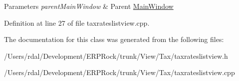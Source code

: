\begin{DoxyParams}{\-Parameters}
{\em parent\-Main\-Window} & \-Parent \hyperlink{class_main_window}{\-Main\-Window} \\
\hline
\end{DoxyParams}


\-Definition at line 27 of file taxrateslistview.\-cpp.



\-The documentation for this class was generated from the following files\-:\begin{DoxyCompactItemize}
\item 
/\-Users/rdal/\-Development/\-E\-R\-P\-Rock/trunk/\-View/\-Tax/taxrateslistview.\-h\item 
/\-Users/rdal/\-Development/\-E\-R\-P\-Rock/trunk/\-View/\-Tax/taxrateslistview.\-cpp\end{DoxyCompactItemize}
